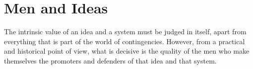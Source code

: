 \section{Men and Ideas}

\begin{quotex}
The intrinsic value of an idea and a system must be judged in itself, apart from everything that is part of the world of contingencies. However, from a practical and historical point of view, what is decisive is the quality of the men who make themselves the promoters and defenders of that idea and that system.
\end{quotex}


